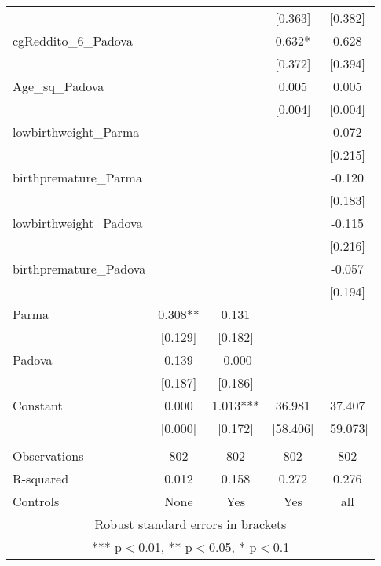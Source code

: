 \documentclass[]{article}
\begin{document}
\begin{tabular}{lcccc}
 &  &  & [0.363] & [0.382] \\
cgReddito\_6\_Padova &  &  & 0.632* & 0.628 \\
 &  &  & [0.372] & [0.394] \\
Age\_sq\_Padova &  &  & 0.005 & 0.005 \\
 &  &  & [0.004] & [0.004] \\
lowbirthweight\_Parma &  &  &  & 0.072 \\
 &  &  &  & [0.215] \\
birthpremature\_Parma &  &  &  & -0.120 \\
 &  &  &  & [0.183] \\
lowbirthweight\_Padova &  &  &  & -0.115 \\
 &  &  &  & [0.216] \\
birthpremature\_Padova &  &  &  & -0.057 \\
 &  &  &  & [0.194] \\
Parma & 0.308** & 0.131 &  &  \\
 & [0.129] & [0.182] &  &  \\
Padova & 0.139 & -0.000 &  &  \\
 & [0.187] & [0.186] &  &  \\
Constant & 0.000 & 1.013*** & 36.981 & 37.407 \\
 & [0.000] & [0.172] & [58.406] & [59.073] \\
 &  &  &  &  \\
Observations & 802 & 802 & 802 & 802 \\
R-squared & 0.012 & 0.158 & 0.272 & 0.276 \\
 Controls & None & Yes & Yes & all \\ \hline
\multicolumn{5}{c}{ Robust standard errors in brackets} \\
\multicolumn{5}{c}{ *** p$<$0.01, ** p$<$0.05, * p$<$0.1} \\
\end{tabular}
\end{document}

